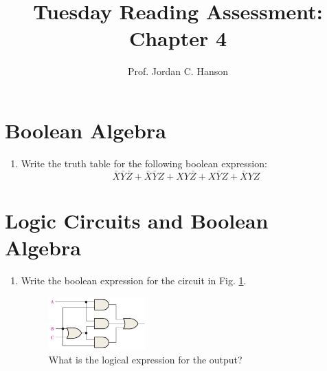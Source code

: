 \documentclass{article}
\begin{document}
\title{Tuesday Reading Assessment: Chapter 4}
\author{Prof. Jordan C. Hanson}

\maketitle

\section{Boolean Algebra}

\begin{enumerate}
\item Write the truth table for the following boolean expression:
\begin{equation}
\bar{X} \bar{Y} \bar{Z} + \bar{X}\bar{Y}Z + XY\bar{Z} + X\bar{Y}Z + \bar{X}YZ
\end{equation}
\vspace{5cm}
\end{enumerate}

\section{Logic Circuits and Boolean Algebra}

\begin{enumerate}
\item Write the boolean expression for the circuit in Fig. \ref{fig:gates1}.
\begin{figure}[ht]
\centering
\includegraphics[width=0.35\textwidth]{gates1.png}
\caption{\label{fig:gates1} What is the logical expression for the output?}
\end{figure}
\end{enumerate}
\end{document}
